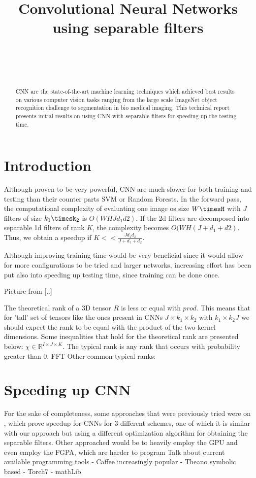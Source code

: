 \documentclass{article} %
\title{Convolutional Neural Networks using separable filters}
\author{
\fontsize{8}{8}\selectfont{Petrescu Viviana}\\
\fontsize{8}{8}\selectfont{EPFL} \\
\fontsize{8}{8}\selectfont{\texttt{viviana.petrescu@epfl.ch}} \\
}
\begin{document}
\maketitle

\begin{abstract}
CNN are the state-of-the-art machine learning techniques which achieved best results on various computer vision tasks ranging from the large scale ImageNet object recognition challenge to segmentation in bio medical imaging.
This technical report presents initial results on using CNN with separable filters for speeding up the testing time.
\end{abstract}

\section{Introduction}
Although proven to be very powerful, CNN are much slower for both training and testing than their counter parts SVM or Random Forests.
In the forward pass, the computational complexity of evaluating one image os size $W\timesH$ with $J$ filters of size $k_{1}\timesk_{2}$ is $O(WHJd_{1}d{2})$. If the 2d filters are decomposed into separable 1d filters of rank $K$, the complexity becomes
 $O(WH(J +d_{1}+d{2})$. Thus, we obtain a speedup if $K<< \frac{Jd_{1}d_{2}}{J +d_{1}+d_{2}}$. 
 
 Although improving training time would be very beneficial since it would allow for more configurations to be tried and larger networks, increasing effort has been put also into speeding up testing time, since training can be done once.
 
 Picture from [..]
 
 The theoretical rank of a 3D tensor $R$ is less or equal with $prod$.
 This means that for 'tall' set of tensors like the ones present in CNNs 
 $J \times k_{1} \times k_{2}$ with $k_{1}\times k_{2}  J$ we should expect the rank
 to be equal with the product of the two kernel dimensions.
 Some inequalities that hold for the theoretical rank are presented below: $\chi \in \mathbb{R}^{I\times J\times K}$. The typical rank is any rank that occurs with probability greater than 0. FFT
 Other common typical ranks:

\section{Speeding up CNN}
 For the sake of completeness, some approaches that were previously tried were on \citep{Jaderberg14b}, which prove speedup for CNNs for 3 different schemes, one of which it is similar with our approach but using a different optimization algorithm for obtaining the separable filters. Other approached would be to heavily employ the GPU and even employ the FGPA, which are harder to program \citep{lecun2010convolutional}
 Talk about current available programming tools
 - Caffee increasingly popular 
 - Theano symbolic based
 - Torch7 
 - mathLib
\end{document}
